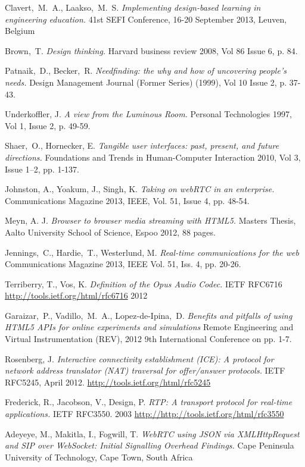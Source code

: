 \documentclass[english,12pt,a4paper,pdftex]{article}
\begin{document}
\begin{thebibliography}{99}


 Clavert,\ M.\ A., Laakso,\ M.\ S. \textit{Implementing design-based learning in engineering education.} 41st SEFI Conference, 16-20 September 2013, Leuven, Belgium

 Brown,\ T. \textit{Design thinking.} Harvard business review 2008, Vol 86 Issue 6, p. 84.

 Patnaik,\ D., Becker,\ R. \textit{Needfinding: the why and how of uncovering people's needs.}   Design Management Journal (Former Series) (1999), Vol 10 Issue 2, p. 37-43.

 Underkoffler, J. \textit{A view from the Luminous Room.} Personal Technologies 1997, Vol 1, Issue 2, p. 49-59.

 Shaer,\ O.,  Hornecker, E. \textit{Tangible user interfaces: past, present, and future directions.} Foundations and Trends in Human-Computer Interaction 2010, Vol 3, Issue 1–2, pp. 1-137.

 Johnston, A., Yoakum, J., Singh, K. \textit{Taking on webRTC in an enterprise.} Communications Magazine 2013, IEEE, Vol. 51, Issue 4, pp. 48-54.

 Meyn, A. J. \textit{Browser to browser media streaming with HTML5.} Masters Thesis, Aalto University School of Science, Espoo 2012, 88 pages.

 Jennings,\ C., Hardie,\ T., Westerlund, M. \textit{Real-time communications for the web} Communications Magazine 2013, IEEE Vol. 51, Iss. 4, pp. 20-26. %

 Terriberry, T., Vos, K. \textit{Definition of the Opus Audio Codec.} IETF RFC6716 \url{http://tools.ietf.org/html/rfc6716} 2012

 Garaizar,\ P., Vadillo,\ M.\ A., Lopez-de-Ipina,\ D. \textit{Benefits and pitfalls of using HTML5 APIs for online experiments and simulations} Remote Engineering and Virtual Instrumentation (REV), 2012 9th International Conference on pp. 1-7. %

 Rosenberg, J. \textit{Interactive connectivity establishment (ICE): A protocol for network address translator (NAT) traversal for offer/answer protocols.} IETF RFC5245, April 2012. \url{http://tools.ietf.org/html/rfc5245}

 Frederick, R., Jacobson, V., Design, P. \textit{RTP: A transport protocol for real-time applications.} IETF RFC3550. 2003 \url{http://http://tools.ietf.org/html/rfc3550}

 Adeyeye, M., Makitla, I., Fogwill, T. \textit{WebRTC using JSON via XMLHttpRequest and SIP over WebSocket: Initial Signalling Overhead Findings.} Cape Peninsula University of Technology, Cape Town, South Africa

\end{thebibliography}
\end{document}

